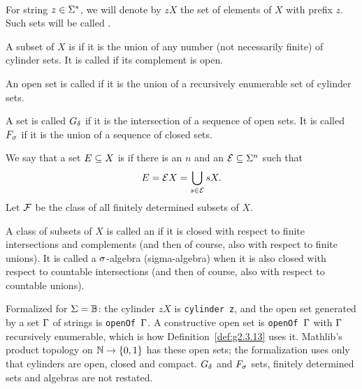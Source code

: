 \begin{definition}\
  \label{def:g2.3.1}
  \leanok
  \begin{bullets}
  \item
  For string \( z\in\Sigma^{*} \), we will denote by \( zX \) the set of elements of \( X \)
with prefix \( z \).
Such sets will be called .
 \item
A subset of \( X \) is  if it is the union of any number (not necessarily
finite) of cylinder sets.
It is called  if its complement is open.
 \item
An open set is called  if it is the union of a recursively
enumerable set of cylinder sets.
\item A set is called \( G_{\delta} \) if it is the intersection of a sequence of open sets.
 It is called \( F_{\sigma} \) if it is the union of a sequence of closed sets.
\item
 We say that a set \( E\subseteq X \) is  if there is an \( n \)
and an \( \mathcal{E}\subseteq \Sigma^{n} \) such that
\begin{align*}
  E = \mathcal{E} X=\bigcup_{s\in\mathcal{E}}s X.
 \end{align*}
Let \( \mathcal{F} \) be the class of all finitely determined subsets of \( X \).
  \item
A class of subsets of \( X \) is called an  if it is closed with respect
to finite intersections and complements (and then of course, also with respect
to finite unions).
It is called a \( \sigma \)-algebra (sigma-algebra)
when it is also closed with respect to countable
intersections (and then of course, also with respect to countable unions).
\end{bullets}
\end{definition}

\begin{formalization}
Formalized for \( \Sigma = \mathbb{B} \): the cylinder \( zX \) is \texttt{cylinder z}, and the open set
generated by a set \( \Gamma \) of strings is \texttt{openOf \( \Gamma \)}. A constructive open set is
\texttt{openOf \( \Gamma \)} with \( \Gamma \) recursively enumerable, which is how
Definition~\ref{def:g2.3.13} uses it. Mathlib's product topology on \( \mathbb{N} \to \{0,1\} \) has
these open sets; the formalization uses only that cylinders are open, closed and compact.
\( G_{\delta} \) and \( F_{\sigma} \) sets, finitely determined sets and algebras are not restated.
\end{formalization}

